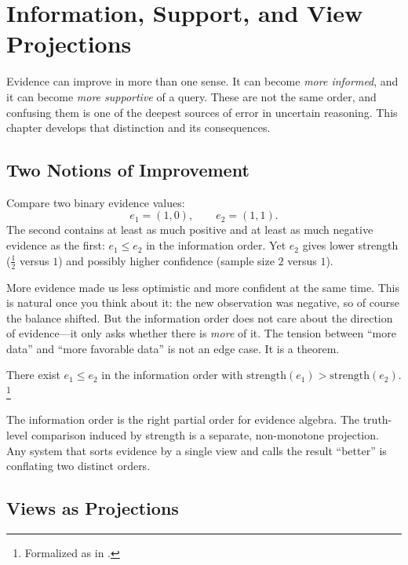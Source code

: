 \documentclass[11pt,openany]{report}
\begin{document}

\chapter{Information, Support, and View Projections}
\label{ch:views}

Evidence can improve in more than one sense.  It can become
\emph{more informed}, and it can become \emph{more supportive} of a
query.  These are not the same order, and confusing them is one of
the deepest sources of error in uncertain reasoning.  This chapter
develops that distinction and its consequences.

\section{Two Notions of Improvement}

Compare two binary evidence values:
\[
  e_1 = (1, 0), \qquad e_2 = (1, 1).
\]
The second contains at least as much positive and at least as much
negative evidence as the first: $e_1 \le e_2$ in the information
order.  Yet $e_2$ gives lower strength ($\tfrac{1}{2}$ versus $1$)
and possibly higher confidence (sample size $2$ versus $1$).

More evidence made us less optimistic and more confident at the same
time.  This is natural once you think about it: the new observation
was negative, so of course the balance shifted.  But the information
order does not care about the direction of evidence---it only asks
whether there is \emph{more} of it.  The tension between ``more
data'' and ``more favorable data'' is not an edge case.  It is a
theorem.

\begin{theorem}
\label{thm:strength-not-monotone}
There exist $e_1 \le e_2$ in the information order with
$\mathrm{strength}(e_1) > \mathrm{strength}(e_2)$.%
\footnote{Formalized as 
in .}
\end{theorem}

\noindent
The information order is the right partial order for evidence algebra.
The truth-level comparison induced by strength is a separate,
non-monotone projection.  Any system that sorts evidence by a single
view and calls the result ``better'' is conflating two distinct orders.


\section{Views as Projections}
\end{document}
